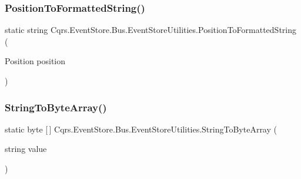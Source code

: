 \subsubsection{\texorpdfstring{Position\+To\+Formatted\+String()}{PositionToFormattedString()}}
{\footnotesize\ttfamily static string Cqrs.\+Event\+Store.\+Bus.\+Event\+Store\+Utilities.\+Position\+To\+Formatted\+String (\begin{DoxyParamCaption}\item[{Position}]{position }\end{DoxyParamCaption})\hspace{0.3cm}{\ttfamily [static]}}

\mbox{\label{classCqrs_1_1EventStore_1_1Bus_1_1EventStoreUtilities_a1bf8620c91556b5e0e804a2467711989_a1bf8620c91556b5e0e804a2467711989}} 
\subsubsection{\texorpdfstring{String\+To\+Byte\+Array()}{StringToByteArray()}}
{\footnotesize\ttfamily static byte \mbox{[}$\,$\mbox{]} Cqrs.\+Event\+Store.\+Bus.\+Event\+Store\+Utilities.\+String\+To\+Byte\+Array (\begin{DoxyParamCaption}\item[{string}]{value }\end{DoxyParamCaption})\hspace{0.3cm}{\ttfamily [static]}}

